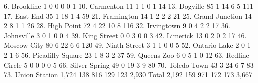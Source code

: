         6. Brookline {\VBAR}         1          0          0          0          0 {\VBAR}         1 
       10. Carmenton {\VBAR}        11          1          1          0          1 {\VBAR}        14 
        13. Dogville {\VBAR}        85          1         14          6          5 {\VBAR}       111 
        17. East End {\VBAR}        35          1         18          1          4 {\VBAR}        59 
      21. Framington {\VBAR}        14          1          2          2          2 {\VBAR}        21 
  25. Grand Junction {\VBAR}        14          2          8          1          1 {\VBAR}        26 
      28. High Point {\VBAR}        72          4         22         10          8 {\VBAR}       116 
      32. Irvingtown {\VBAR}         9          0          4          2          2 {\VBAR}        17 
      36. Johnsville {\VBAR}         3          0          1          0          0 {\VBAR}         4 
     39. King Street {\VBAR}         0          0          3          0          0 {\VBAR}         3 
        42. Limerick {\VBAR}        13          0          2          0          2 {\VBAR}        17 
     46. Moscow City {\VBAR}        80          6         22          6          6 {\VBAR}       120 
    49. Ninth Street {\VBAR}         3          1          1          0          0 {\VBAR}         5 
    52. Ontario Lake {\VBAR}         2          0          1          2          1 {\VBAR}         6 
56. Picadilly Square {\VBAR}        23          1          8          3          2 {\VBAR}        37 
      59. Queens Zoo {\VBAR}         6          0          5          1          0 {\VBAR}        12 
  63. Redline Circle {\VBAR}         5          0          0          0          0 {\VBAR}         5 
   66. Silver Spring {\VBAR}        49          0         19          3          9 {\VBAR}        80 
     70. Toledo Town {\VBAR}        43          3         24          6          7 {\VBAR}        83 
   73. Union Station {\VBAR}     1,724        138        816        129        123 {\VBAR}     2,930 
               Total {\VBAR}     2,192        159        971        172        173 {\VBAR}     3,667 
{\smallskip}
{\smallskip}
